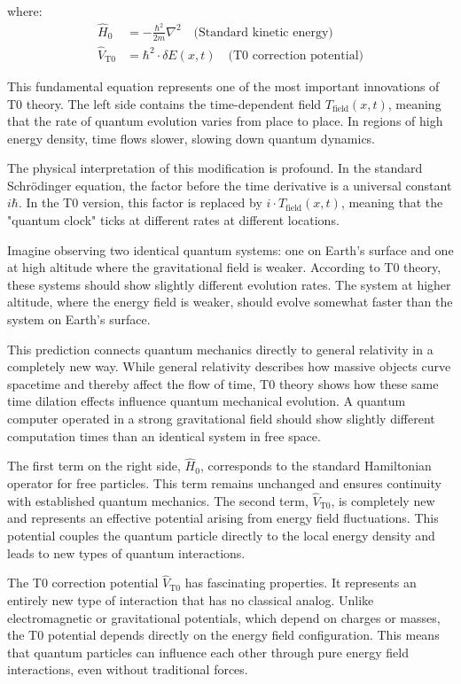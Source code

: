 \documentclass[12pt,a4paper]{article}
\newcommand{\deltaE}{\delta E}
\theoremstyle{definition}
\theoremstyle{remark}
\begin{document}
where:
\begin{align}
	\hat{H}_0 &= -\frac{\hbar^2}{2m} \nabla^2 \quad \text{(Standard kinetic energy)} \\
	\hat{V}_{\text{T0}} &= \hbar^2 \cdot \deltaE(x,t) \quad \text{(T0 correction potential)}
\end{align}

This fundamental equation represents one of the most important innovations of T0 theory. The left side contains the time-dependent field $T_{\text{field}}(x,t)$, meaning that the rate of quantum evolution varies from place to place. In regions of high energy density, time flows slower, slowing down quantum dynamics.

The physical interpretation of this modification is profound. In the standard Schrödinger equation, the factor before the time derivative is a universal constant $i\hbar$. In the T0 version, this factor is replaced by $i \cdot T_{\text{field}}(x,t)$, meaning that the "quantum clock" ticks at different rates at different locations.

Imagine observing two identical quantum systems: one on Earth's surface and one at high altitude where the gravitational field is weaker. According to T0 theory, these systems should show slightly different evolution rates. The system at higher altitude, where the energy field is weaker, should evolve somewhat faster than the system on Earth's surface.

This prediction connects quantum mechanics directly to general relativity in a completely new way. While general relativity describes how massive objects curve spacetime and thereby affect the flow of time, T0 theory shows how these same time dilation effects influence quantum mechanical evolution. A quantum computer operated in a strong gravitational field should show slightly different computation times than an identical system in free space.

The first term on the right side, $\hat{H}_0$, corresponds to the standard Hamiltonian operator for free particles. This term remains unchanged and ensures continuity with established quantum mechanics. The second term, $\hat{V}_{\text{T0}}$, is completely new and represents an effective potential arising from energy field fluctuations. This potential couples the quantum particle directly to the local energy density and leads to new types of quantum interactions.

The T0 correction potential $\hat{V}_{\text{T0}}$ has fascinating properties. It represents an entirely new type of interaction that has no classical analog. Unlike electromagnetic or gravitational potentials, which depend on charges or masses, the T0 potential depends directly on the energy field configuration. This means that quantum particles can influence each other through pure energy field interactions, even without traditional forces.
\end{document}
